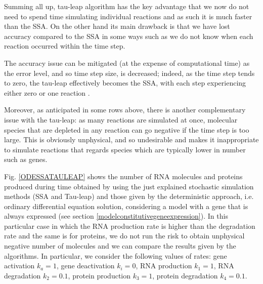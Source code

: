 \documentclass[12pt,a4paper]{report}
\begin{document}
Summing all up, tau-leap algorithm has the key advantage that we now do not need to spend time simulating individual reactions and as such it is much faster than the SSA. On the other hand its main drawback is that we have lost accuracy compared to the SSA in some ways such as we do not know when each reaction occurred within the time step.


The accuracy issue can be mitigated (at the expense of computational time) as the error level, and so time step size, is decreased; indeed, as the time step tends to zero, the tau-leap effectively becomes the SSA, with each step experiencing either zero or one reaction \cite{Article}. 


Moreover, as anticipated in some rows above, there is another complementary issue with the tau-leap: as many reactions are simulated at once, molecular species that are depleted in any reaction can go negative if the time step is too large. This is obviously unphysical, and so undesirable and makes it inappropriate to simulate reactions that regards species which are typically lower in number such as genes. 

Fig. \ref{ODESSATAULEAP} shows the number of RNA molecules and proteins produced during time obtained by using the just explained stochastic simulation methods (SSA and Tau-leap) and those given by the deterministic approach, i.e. ordinary differential equation solution, considering a model with a gene that is always expressed (see section \ref{modelconstitutivegeneexpression}). In this particular case in which the RNA production rate is higher than the degradation rate and the same is for proteins, we do not run the risk to obtain unphysical negative number of molecules and we can compare the results given by the algorithms. In particular, we consider the following values of rates: gene activation $k_{a}=1$, gene deactivation $k_{i}=0$, RNA production $k_{1}=1$, RNA degradation $k_{2}=0.1$, protein production $k_{3}=1$, protein degradation $k_{4}=0.1$.
\end{document}

